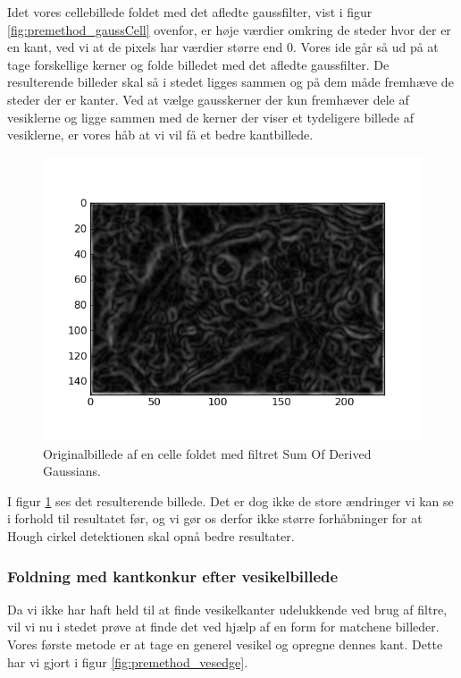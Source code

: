Idet vores cellebillede foldet med det afledte gaussfilter, vist i figur \ref{fig:premethod_gaussCell} ovenfor, er høje værdier omkring de steder hvor der er en kant, ved vi at de pixels har værdier større end 0. Vores ide går så ud på at tage forskellige kerner og folde billedet med det afledte gaussfilter. De resulterende billeder skal så i stedet ligges sammen og på dem måde fremhæve de steder der er kanter. Ved at vælge gausskerner der kun fremhæver dele af vesiklerne og ligge sammen med de kerner der viser et tydeligere billede af vesiklerne, er vores håb at vi vil få et bedre kantbillede.

\begin{figure}[H]
	\centering
	\includegraphics[scale=0.8]{files/premethod/img/sum_der_gauss.png}
	\caption{Originalbillede af en celle foldet med filtret Sum Of Derived Gaussians.\label{fig:premethod_sumOfDiff}}
\end{figure}

I figur \ref{fig:premethod_sumOfDiff} ses det resulterende billede. Det er dog ikke de store ændringer vi kan se i forhold til resultatet før, og vi gør os derfor ikke større forhåbninger for at Hough cirkel detektionen skal opnå bedre resultater.

\subsubsection{Foldning med kantkonkur efter vesikelbillede}
Da vi ikke har haft held til at finde vesikelkanter udelukkende ved brug af filtre, vil vi nu i stedet prøve at finde det ved hjælp af en form for matchene billeder. Vores første metode er at tage en generel vesikel og opregne dennes kant. Dette har vi gjort i figur \ref{fig:premethod_vesedge}. 

